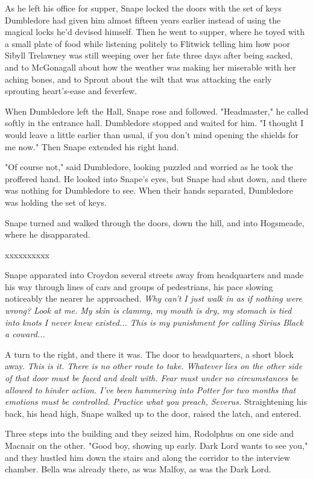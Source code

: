 \documentclass[a4paper,11pt]{article}
\begin{document}
As he left his office for supper, Snape locked the doors with the set of keys Dumbledore had given him almost fifteen years earlier instead of using the magical locks he'd devised himself. Then he went to supper, where he toyed with a small plate of food while listening politely to Flitwick telling him how poor Sibyll Trelawney was still weeping over her fate three days after being sacked, and to McGonagall about how the weather was making her miserable with her aching bones, and to Sprout about the wilt that was attacking the early sprouting heart's-ease and feverfew.

When Dumbledore left the Hall, Snape rose and followed. "Headmaster," he called softly in the entrance hall. Dumbledore stopped and waited for him. "I thought I would leave a little earlier than usual, if you don't mind opening the shields for me now." Then Snape extended his right hand.

"Of course not," said Dumbledore, looking puzzled and worried as he took the proffered hand. He looked into Snape's eyes, but Snape had shut down, and there was nothing for Dumbledore to see. When their hands separated, Dumbledore was holding the set of keys.

Snape turned and walked through the doors, down the hill, and into Hogsmeade, where he disapparated.

xxxxxxxxxx

Snape apparated into Croydon several streets away from headquarters and made his way through lines of cars and groups of pedestrians, his pace slowing noticeably the nearer he approached. \emph{Why can't I just walk in as if nothing were wrong? Look at me. My skin is clammy, my mouth is dry, my stomach is tied into knots I never knew existed... This is my punishment for calling Sirius Black a coward...}

A turn to the right, and there it was. The door to headquarters, a short block away. \emph{This is it. There is no other route to take. Whatever lies on the other side of that door must be faced and dealt with. Fear must under no circumstances be allowed to hinder action. I've been hammering into Potter for two months that emotions must be controlled. Practice what you preach, Severus.} Straightening his back, his head high, Snape walked up to the door, raised the latch, and entered.

Three steps into the building and they seized him, Rodolphus on one side and Macnair on the other. "Good boy, showing up early. Dark Lord wants to see you," and they hustled him down the stairs and along the corridor to the interview chamber. Bella was already there, as was Malfoy, as was the Dark Lord.
\end{document}

